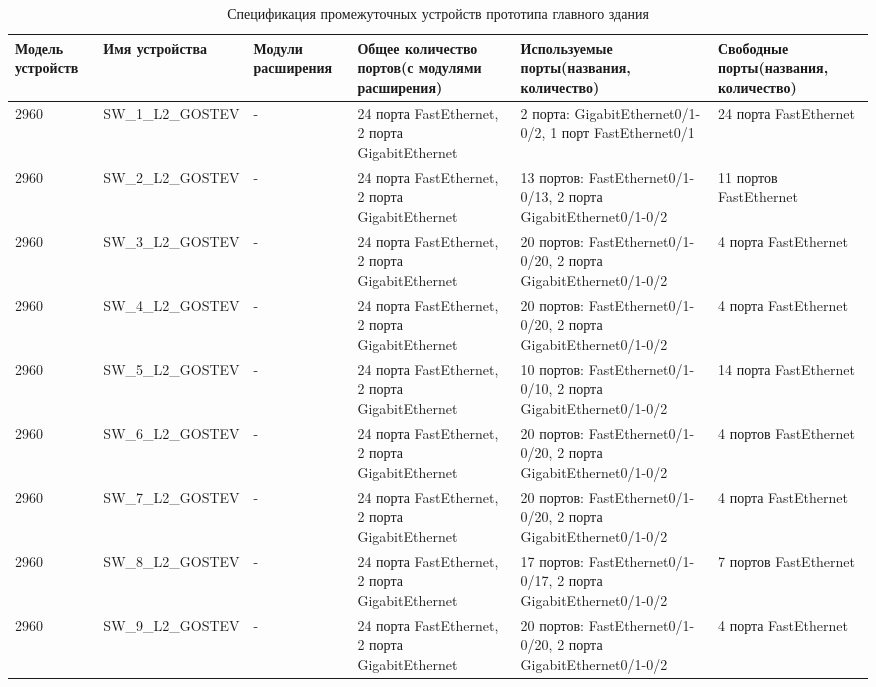 \documentclass[14pt, a4paper]{extarticle}
\numberwithin{equation}{section}
\begin{document}
\begin{landscape}

\begin{table}[H]
\centering
\small
\caption{Спецификация промежуточных устройств прототипа главного здания}
\label{table:mainDepDevicesSpecs}
\begin{tabular}{|m{2.5cm}|m{4cm}|m{2.5cm}|m{4.2cm}|m{5.3cm}|m{4cm}|}
\hline
\textbf{Модель устройств} & \textbf{Имя устройства} & \textbf{Модули расширения} & \textbf{Общее количество портов(с модулями расширения)} & \textbf{Используемые порты(названия, количество)} & \textbf{Свободные порты(названия, количество)} \\
\hline
2960 & 
SW\_1\_L2\_GOSTEV & 
- & 
24 порта FastEthernet, 2 порта GigabitEthernet 
& 2 порта: GigabitEthernet0/1-0/2, 1 порт FastEthernet0/1 
& 24 порта FastEthernet \\
\hline
2960 & 
SW\_2\_L2\_GOSTEV & 
- & 
24 порта FastEthernet, 2 порта GigabitEthernet & 
13 портов: FastEthernet0/1-0/13, 2 порта GigabitEthernet0/1-0/2 & 
11 портов FastEthernet \\
\hline
2960 &
SW\_3\_L2\_GOSTEV &
- &
24 порта FastEthernet, 2 порта GigabitEthernet &
20 портов: FastEthernet0/1-0/20, 2 порта GigabitEthernet0/1-0/2 &
4 порта FastEthernet \\
\hline
2960 &
SW\_4\_L2\_GOSTEV &
- &
24 порта FastEthernet, 2 порта GigabitEthernet &
20 портов: FastEthernet0/1-0/20, 2 порта GigabitEthernet0/1-0/2 &
4 порта FastEthernet \\
\hline
2960 &
SW\_5\_L2\_GOSTEV &
- &
24 порта FastEthernet, 2 порта GigabitEthernet &
10 портов: FastEthernet0/1-0/10, 2 порта GigabitEthernet0/1-0/2 &
14 порта FastEthernet \\
\hline
2960 &
SW\_6\_L2\_GOSTEV &
- &
24 порта FastEthernet, 2 порта GigabitEthernet &
20 портов: FastEthernet0/1-0/20, 2 порта GigabitEthernet0/1-0/2 &
4 портов FastEthernet \\
\hline
2960 &
SW\_7\_L2\_GOSTEV &
- &
24 порта FastEthernet, 2 порта GigabitEthernet &
20 портов: FastEthernet0/1-0/20, 2 порта GigabitEthernet0/1-0/2 &
4 порта FastEthernet \\
\hline
2960 &
SW\_8\_L2\_GOSTEV &
- &
24 порта FastEthernet, 2 порта GigabitEthernet &
17 портов: FastEthernet0/1-0/17, 2 порта GigabitEthernet0/1-0/2 &
7 портов FastEthernet \\
\hline
2960 &
SW\_9\_L2\_GOSTEV &
- &
24 порта FastEthernet, 2 порта GigabitEthernet &
20 портов: FastEthernet0/1-0/20, 2 порта GigabitEthernet0/1-0/2 &
4 порта FastEthernet \\
\end{tabular}
\end{table}
\end{landscape}
\end{document}
